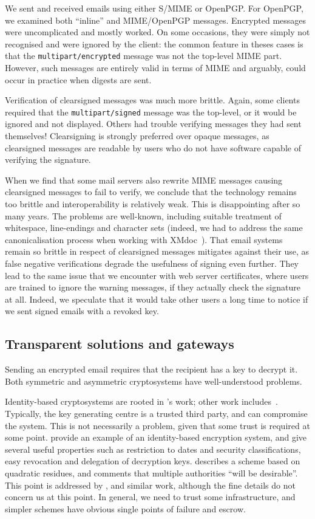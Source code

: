 \documentclass{article}
\def\citeN{\citet}
\def\cite{\citep}
\begin{document}
We sent and received emails using either S/MIME or OpenPGP.  For
OpenPGP, we examined both “inline” and MIME/OpenPGP messages.  
Encrypted messages were uncomplicated and mostly worked.  On some
occasions, they were simply not recognised and were ignored by the
client: the common feature in theses cases is that the
\verb|multipart/encrypted| message was not the top-level MIME part.
However, such messages are entirely valid in terms of MIME and
arguably, could occur in practice when digests are sent.

Verification of clearsigned messages was much more brittle.  Again,
some clients required that the \verb|multipart/signed| message was the
top-level, or it would be ignored and not displayed.  Others had trouble
verifying messages they had sent themselves!   Clearsigning is strongly
preferred over opaque messages, as clearsigned messages are readable
by users who do not have software capable of verifying the signature.

When we find that some mail servers also rewrite MIME messages causing
clearsigned messages to fail to verify, we conclude that the
technology remains too brittle and interoperability is relatively
weak.  This is disappointing after so many years.  The problems are
well-known, including suitable treatment of whitespace, line-endings
and character sets (indeed, we had to address the same canonicalisation
process when working with XMdoc~\cite{Brooke+09b}).  That email
systems remain so brittle in respect of clearsigned messages mitigates
against their use, as false negative verifications degrade the
usefulness of signing even further.  They lead to the same issue that
we encounter with web server certificates, where users are trained to
ignore the warning messages, if they actually check the signature at
all.  Indeed, we speculate that it would take other users a long time
to notice if we sent signed emails with a revoked key.

\subsection{Transparent solutions and gateways}\label{sec:gateways}

Sending an encrypted email requires that the recipient has a key to
decrypt it.  Both symmetric and asymmetric cryptosystems have
well-understood problems.

Identity-based cryptosystems are rooted in \citeN{Shamir85}'s work;
other work includes~\citeN{Martin06}.
Typically, the key generating centre is a trusted third party, and can
compromise the system.  This is not necessarily a problem, given that
some trust is required at some point.  \citeN{Boneh+01} provide an
example of an identity-based encryption system, and give several
useful properties such as restriction to dates and security
classifications, easy revocation and delegation of decryption keys.
\citeN{Cocks01} describes a scheme based on quadratic residues, and
comments that multiple authorities ``will be desirable''.  This point
is addressed by \citeN{Lee+04}, \citeN{Gentry03} and similar work, although the fine
details do not concern us at this point.  In general, we need to trust
some infrastructure, and simpler schemes have obvious single points of
failure and escrow.
\end{document}
